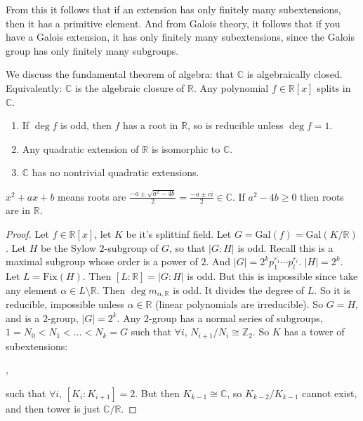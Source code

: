 \documentclass[9pt,reqno,twoside]{amsbook}
\theoremstyle{plain}
\numberwithin{section}{chapter}
\numberwithin{equation}{chapter}
\theoremstyle{definition}
\theoremstyle{remark}
\theoremstyle{plain}
\newcommand{\R}{\mathbb{R}}
\newcommand{\z}{\mathbb{Z}}
\renewcommand{\c}{\mathbb{C}}
\newcommand{\fracc}{\frac}
\newcommand{\gal}{\mathrm{Gal}}
\newcommand{\fix}{\mathrm{Fix}}
\newcommand{\qwe}{\sqrt}
\renewcommand{\geq}{\geqslant}
\begin{document}
 From this it follows that if an extension has only finitely many subextensions, then it has a primitive element. And from Galois theory, it follows that if you have a Galois extension, it has only finitely many subextensions, since the Galois group has only finitely many subgroups. 
 
 
 We discuss the fundamental theorem of algebra: that $\c$ is algebraically closed. Equivalently: $\c$ is the algebraic closure of $\R$. Any polynomial $f \in \R[x]$ splits in $\c$. 
 
 \begin{enumerate}
 \item If $\deg f$ is odd, then $f$ has a root in $\R$, so is reducible unless $\deg f = 1$. 
 \item Any quadratic extension of $\R$ is isomorphic to $\c$. 
 \item $\c$ has no nontrivial quadratic extensions. 
 \end{enumerate}
 
 $x^2 + ax + b$ means roots are $\fracc{-a \pm \qwe{a^2 - 4b}}{2} = \fracc{-a \pm ci}{2} \in \c$. If $a^2 - 4b \geq 0$ then roots are in $\R$. 
 
 \begin{proof}
 Let $f \in \R[x]$, let $K$ be it's splittinf field. Let $G = \gal(f) = \gal(K/\R)$. Let $H$ be the Sylow $2$-subgroup of $G$, so that $|G:H|$ is odd. Recall this is a maximal subgroup whose order is a power of $2$. And $|G| = 2^kp_1^{r_1}\cdots p_l^{r_l}$. $|H| = 2^k$. Let $L = \fix(H)$. Then $[L:\R] = |G:H|$ is odd. But this is impossible since take any element $\alpha \in L \setminus \R$. Then $\deg m_{\alpha,\R}$ is odd. It divides the degree of $L$. So it is reducible, impossible unless $\alpha \in \R$ (linear polynomials are irreducible). So $G = H$, and is a 2-group, $|G| = 2^k$. 
 Any 2-group has a normal series of subgroups, $1 = N_0 < N_1 < ... < N_k = G$ such that $\forall i$, $N_{i + 1}/N_i \cong \z_2$. So $K$ has a tower of subextensions:
 
 \begin{center}
,
 \end{center}
 such that $\forall i$, $[K_i:K_{ i +1}] = 2$. But then $K_{k - 1} \cong \c$, so $K_{k - 2}/K_{k - 1}$ cannot exist, and then tower is just $\c/\R$. 
 
  \end{proof}
  
\end{document}
